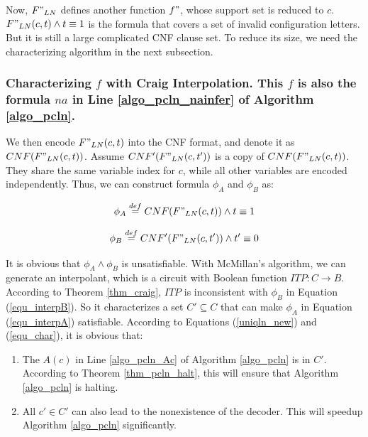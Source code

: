 \documentclass[journal]{IEEEtran}
\begin{document}
Now,
$F"_{LN}$ defines another function $f"$,
whose support set is reduced to $c$.
$F"_{LN}(c,t)\wedge t\equiv 1$ is the formula that covers a set of invalid configuration letters.
But it is still a large complicated CNF clause set.
To reduce its size,
we need the characterizing algorithm in the next subsection.

\subsubsection{\textbf{Characterizing $f$ with Craig Interpolation. This $f$ is also the formula $na$ in Line \ref{algo_pcln_nainfer} of Algorithm \ref{algo_pcln}.}}

We then encode $F"_{LN}(c,t)$ into the CNF format,
and denote it as $CNF(F"_{LN}(c,t))$.
Assume $CNF'(F"_{LN}(c,t'))$ is a copy of $CNF(F"_{LN}(c,t))$.
They share the same variable index for $c$,
while all other variables are encoded independently.
Thus,
we can construct formula $\phi_A$ and $\phi_B$ as:

\begin{equation}\label{equ_interpA}
\phi_A\stackrel{def}{=}CNF(F"_{LN}(c,t))\wedge t\equiv 1
\end{equation}

\begin{equation}\label{equ_interpB}
\phi_B\stackrel{def}{=}CNF'(F"_{LN}(c,t'))\wedge t'\equiv 0
\end{equation}

It is obvious that $\phi_A\wedge \phi_B$ is unsatisfiable.
With McMillan's algorithm\cite{interp_McMillan},
we can generate an interpolant,
which is a circuit with Boolean function $ITP:C\to B$.
According to Theorem \ref{thm_craig},
$ITP$ is inconsistent with $\phi_B$ in Equation (\ref{equ_interpB}).
So it characterizes a set $C'\subseteq C$ that can make $\phi_A$ in Equation (\ref{equ_interpA}) satisfiable.
According to Equations (\ref{uniqln_new}) and (\ref{equ_char}),
it is obvious that:
\begin{enumerate}
 \item The $A(c)$ in Line \ref{algo_pcln_Ac} of Algorithm \ref{algo_pcln} is in $C'$.
According to Theorem \ref{thm_pcln_halt},
this will ensure that Algorithm \ref{algo_pcln} is halting.
 \item All $c'\in C'$ can also lead to the nonexistence of the decoder.
This will speedup Algorithm \ref{algo_pcln} significantly.
\end{enumerate}
\end{document}
